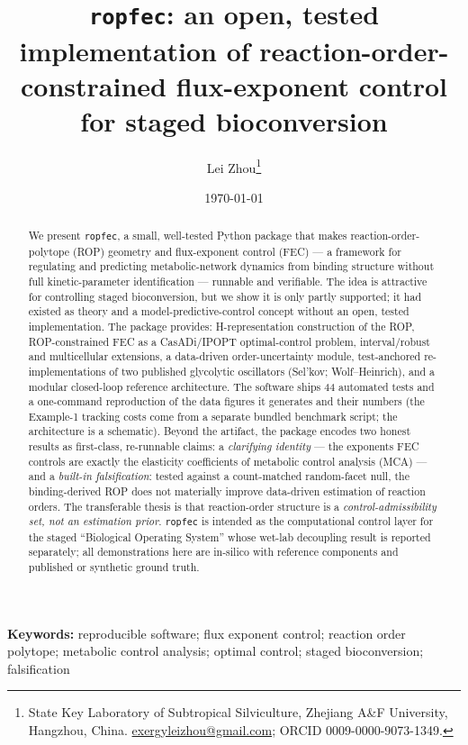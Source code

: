 \documentclass[11pt]{article}
\title{\textbf{\texttt{ropfec}: an open, tested implementation of
reaction-order-constrained flux-exponent control for staged bioconversion}}
\author{Lei Zhou\thanks{State Key Laboratory of Subtropical Silviculture, Zhejiang
A\&F University, Hangzhou, China. \href{mailto:exergyleizhou@gmail.com}{exergyleizhou@gmail.com};
ORCID 0009-0000-9073-1349.}}
\date{\today}
\begin{document}
\maketitle

\begin{abstract}
\noindent
We present \texttt{ropfec}, a small, well-tested Python package that makes
reaction-order-polytope (ROP) geometry and flux-exponent control (FEC) --- a framework for
regulating and predicting metabolic-network dynamics from binding structure without full
kinetic-parameter identification --- runnable and verifiable. The idea is attractive for
controlling staged bioconversion, but we show it is only partly supported; it had existed as
theory and a model-predictive-control concept without an open, tested implementation. The
package provides:
H-representation construction of the ROP, ROP-constrained FEC as a CasADi/IPOPT
optimal-control problem, interval/robust and multicellular extensions, a data-driven
order-uncertainty module, test-anchored re-implementations of two published glycolytic
oscillators (Sel'kov; Wolf--Heinrich), and a modular closed-loop reference
architecture. The software ships 44 automated tests and a one-command reproduction of the data figures it
generates and their numbers (the Example-1 tracking costs come from a separate bundled
benchmark script; the architecture is a schematic). Beyond the artifact, the package encodes two honest
results as first-class, re-runnable claims: a \emph{clarifying identity} --- the exponents
FEC controls are exactly the elasticity coefficients of metabolic control analysis (MCA)
--- and a \emph{built-in falsification}: tested against a count-matched random-facet null,
the binding-derived ROP does not materially improve data-driven estimation of reaction orders.
The transferable thesis is that reaction-order structure is a \emph{control-admissibility
set, not an estimation prior}. \texttt{ropfec} is intended as the computational control layer for the
staged ``Biological Operating System'' whose wet-lab decoupling result is reported
separately; all demonstrations here are in-silico with reference components and published
or synthetic ground truth.
\end{abstract}

\noindent\textbf{Keywords:} reproducible software; flux exponent control; reaction order
polytope; metabolic control analysis; optimal control; staged bioconversion; falsification
\end{document}
